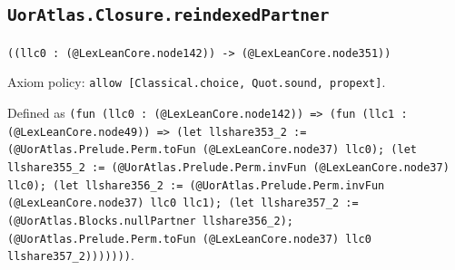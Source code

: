 \documentclass[11pt]{article}
\begin{document}
\subsection*{\texttt{UorAtlas.Closure.reindexedPartner}}
\noindent\texttt{((llc0 : (@LexLeanCore.node142)) -> (@LexLeanCore.node351))}\par
\noindent Axiom policy: \texttt{allow [Classical.choice, Quot.sound, propext]}.\par
\noindent Defined as \texttt{(fun (llc0 : (@LexLeanCore.node142)) => (fun (llc1 : (@LexLeanCore.node49)) => (let llshare353\_2 := (@UorAtlas.Prelude.Perm.toFun (@LexLeanCore.node37) llc0); (let llshare355\_2 := (@UorAtlas.Prelude.Perm.invFun (@LexLeanCore.node37) llc0); (let llshare356\_2 := (@UorAtlas.Prelude.Perm.invFun (@LexLeanCore.node37) llc0 llc1); (let llshare357\_2 := (@UorAtlas.Blocks.nullPartner llshare356\_2); (@UorAtlas.Prelude.Perm.toFun (@LexLeanCore.node37) llc0 llshare357\_2)))))))}.\par
\end{document}
